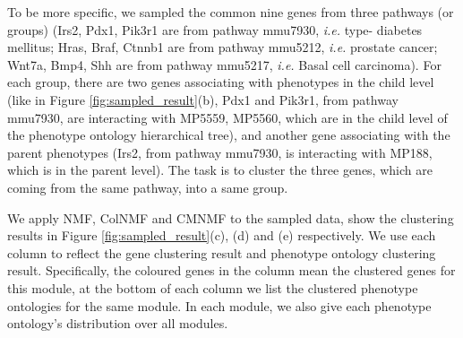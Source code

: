 \documentclass{bmcart}
\begin{document}
To be more specific, we sampled the common nine genes from three pathways (or groups) (Irs2, Pdx1, Pik3r1 are from pathway mmu7930, \emph{i.e.} type-\uppercase\expandafter{} diabetes mellitus; Hras, Braf, Ctnnb1 are from pathway mmu5212, \emph{i.e.} prostate cancer; Wnt7a, Bmp4, Shh are from pathway mmu5217, \emph{i.e.} Basal cell carcinoma). For each group, there are two genes associating with phenotypes in the child level (like in Figure \ref{fig:sampled_result}(b), Pdx1 and Pik3r1, from pathway mmu7930, are interacting with MP5559, MP5560, which are in the child level of the phenotype ontology hierarchical tree), and another gene associating with the parent phenotypes (Irs2, from pathway mmu7930, is interacting with MP188, which is in the parent level). The task is to cluster the three genes, which are coming from the same pathway, into a same group.

  We apply NMF, ColNMF and CMNMF to the sampled data, show the clustering results in Figure \ref{fig:sampled_result}(c), (d) and (e) respectively. We use each column to reflect the gene clustering result and phenotype ontology clustering result. Specifically, the coloured genes in the column mean the clustered genes for this module, at the bottom of each column we list the clustered phenotype ontologies for the same module. In each module, we also give each phenotype ontology's distribution over all modules.
  
\end{document}
